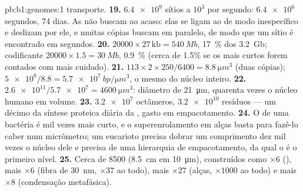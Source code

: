 \begin{solution}{pb:b1:genomes:1}
transporte.
\textbf{19.} $\num{6.4e9}$ sítios a $10^3$ por segundo: $\num{6.4e6}$
segundos, 74 dias. As  não buscam ao acaso: elas se ligam ao
 de modo inespecífico e deslizam por ele, e muitas cópias buscam em
paralelo, de modo que um sítio é encontrado em segundos.
\textbf{20.} $\num{20000}\times 27\,\mathrm{kb} = \qty{540}{Mb}$,
\qty{17}{\%} dos \qty{3.2}{Gb}; codificante $\num{20000}\times 1.5 =
\qty{30}{Mb}$, \qty{0.9}{\%} (cerca de 1.5\% se os  mais curtos
forem contados com mais cuidado).
\textbf{21.} $113\times 2\times 250/6400 = \qty{8.8}{\micro m^3}$ (duas
cópias); $\num{5e8}/8.8 = \qty{5.7e7}{bp/\micro m^3}$, o mesmo do núcleo
inteiro.
\textbf{22.} $\num{2.6e11}/\num{5.7e7} = \qty{4600}{\micro m^3}$:
diâmetro de \qty{21}{\micro m}, quarenta vezes o núcleo humano em
volume.
\textbf{23.} $\num{3.2e7}$ octâmeros, $\num{3.2e10}$ resíduos --- um
décimo da síntese proteica diária da , gasto em empacotamento.
\textbf{24.} O  de uma bactéria é mil vezes mais curto, e o
superenrolamento em alças basta para fazê-lo caber num micrômetro; um
eucarioto precisa dobrar um comprimento dez mil vezes o núcleo dele e
precisa de uma hierarquia de empacotamento, da qual o  é o
primeiro nível.
\textbf{25.} Cerca de \num{8500} (\qty{8.5}{cm} em \qty{10}{\micro m}),
construídos como $\times 6$ (), mais $\times 6$ (fibra de
\qty{30}{nm}, $\times 37$ ao todo), mais $\times 27$ (alças,
$\times 1000$ ao todo) e mais $\times 8$ (condensação metafásica).
\end{solution}
